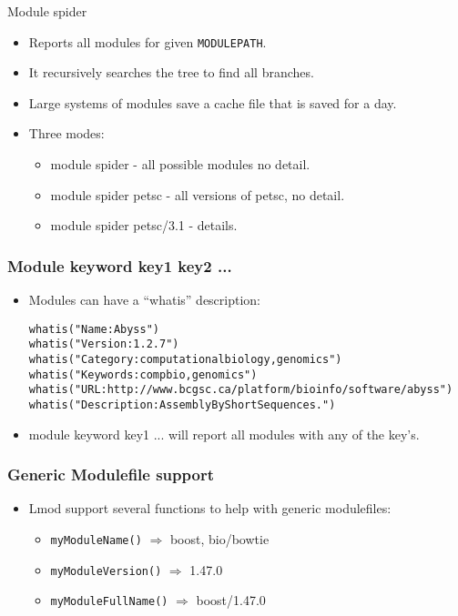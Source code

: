 \documentclass{beamer}
\begin{document}
\begin{frame}{Module spider}
  \begin{itemize}
    \item Reports all modules for given \texttt{MODULEPATH}.
    \item It recursively searches the tree to find all branches.
    \item Large systems of modules save a cache file that is saved for
      a day.
    \item Three modes:
      \begin{itemize}
        \item module spider - all possible modules no detail.
        \item module spider petsc - all versions of petsc, no detail.
        \item module spider petsc/3.1 - details.
      \end{itemize}
  \end{itemize}
\end{frame}

\begin{frame}[fragile]
    \frametitle{Module keyword key1 key2 ...}
    \begin{itemize}
      \item
    Modules can have a ``whatis'' description:
    {\tiny
\begin{alltt}
whatis("Name: Abyss")
whatis("Version: 1.2.7")
whatis("Category: computational biology, genomics")
whatis("Keywords: compbio, genomics")
whatis("URL:http://www.bcgsc.ca/platform/bioinfo/software/abyss")
whatis("Description: Assembly By Short Sequences.")
\end{alltt}
    }
  \item {\color{blue}module keyword key1 ...} will report all modules
    with any of the {\color{blue}key}'s.
  \end{itemize}
\end{frame}

\begin{frame}[fragile]
    \frametitle{Generic Modulefile support}
  \begin{itemize}
    \item Lmod support several functions to help with generic modulefiles:
      \begin{itemize}
        \item \texttt{myModuleName()}  $\Rightarrow$ boost, bio/bowtie
        \item \texttt{myModuleVersion()}  $\Rightarrow$ 1.47.0
        \item \texttt{myModuleFullName()}  $\Rightarrow$ boost/1.47.0
      \end{itemize}
  \end{itemize}
\end{frame}
\end{document}
